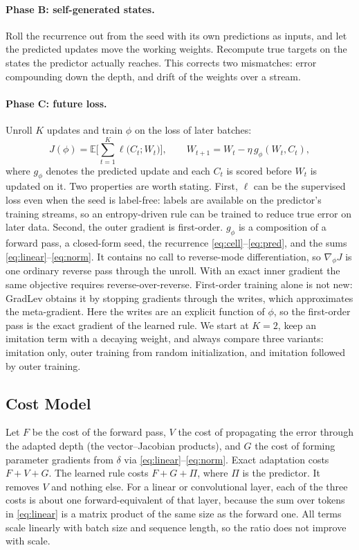 \documentclass{article}
\begin{document}
\paragraph{Phase B: self-generated states.} Roll the recurrence out from the
seed with its own predictions as inputs, and let the predicted updates move the
working weights. Recompute true targets on the states the predictor actually
reaches. This corrects two mismatches: error compounding down the depth, and
drift of the weights over a stream.

\paragraph{Phase C: future loss.} Unroll $K$ updates and train $\phi$ on the
loss of later batches:
\begin{equation}
J(\phi) = \mathbb{E}\Big[\sum_{t=1}^{K} \ell\big(C_t; W_t\big)\Big],
\qquad W_{t+1} = W_t - \eta\, g_\phi(W_t, C_t),
\end{equation}
where $g_\phi$ denotes the predicted update and each $C_t$ is scored before
$W_t$ is updated on it. Two properties are worth stating. First, $\ell$ can be
the supervised loss even when the seed is label-free: labels are available on
the predictor's training streams, so an entropy-driven rule can be trained to
reduce true error on later data. Second, the outer gradient is first-order.
$g_\phi$ is a composition of a forward pass, a closed-form seed, the recurrence
\eqref{eq:cell}--\eqref{eq:pred}, and the sums
\eqref{eq:linear}--\eqref{eq:norm}. It contains no call to reverse-mode
differentiation, so $\nabla_\phi J$ is one ordinary reverse pass through the
unroll. With an exact inner gradient the same objective requires
reverse-over-reverse. First-order training alone is not new: GradLev obtains it
by stopping gradients through the writes, which approximates the
meta-gradient. Here the writes are an explicit function of $\phi$, so the
first-order pass is the exact gradient of the learned rule. We start at $K=2$, keep an imitation term with a decaying
weight, and always compare three variants: imitation only, outer training from
random initialization, and imitation followed by outer training.

\subsection{Cost Model}
\label{sec:cost}

Let $F$ be the cost of the forward pass, $V$ the cost of propagating the error
through the adapted depth (the vector--Jacobian products), and $G$ the cost of
forming parameter gradients from $\delta$ via
\eqref{eq:linear}--\eqref{eq:norm}. Exact adaptation costs $F + V + G$. The
learned rule costs $F + G + \Pi$, where $\Pi$ is the predictor. It removes $V$
and nothing else. For a linear or convolutional layer, each of the three costs
is about one forward-equivalent of that layer, because the sum over tokens in
\eqref{eq:linear} is a matrix product of the same size as the forward one. All
terms scale linearly with batch size and sequence length, so the ratio does not
improve with scale.
\end{document}
